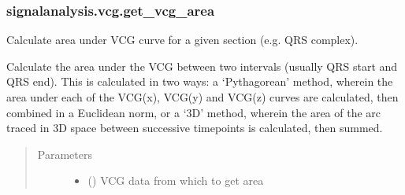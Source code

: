 \documentclass[letterpaper,10pt,english]{sphinxmanual}
\begin{document}
\subsubsection{signalanalysis.vcg.get\_vcg\_area}
\label{\detokenize{_autosummary/signalanalysis.vcg.get_vcg_area:signalanalysis-vcg-get-vcg-area}}\label{\detokenize{_autosummary/signalanalysis.vcg.get_vcg_area::doc}}

\begin{fulllineitems}
\label{\detokenize{_autosummary/signalanalysis.vcg.get_vcg_area:signalanalysis.vcg.get_vcg_area}}
\sphinxAtStartPar
Calculate area under VCG curve for a given section (e.g. QRS complex).

\sphinxAtStartPar
Calculate the area under the VCG between two intervals (usually QRS start and QRS end). This is calculated in two
ways: a ‘Pythagorean’ method, wherein the area under each of the VCG(x), VCG(y) and VCG(z) curves are calculated,
then combined in a Euclidean norm, or a ‘3D’ method, wherein the area of the arc traced in 3D space between
successive timepoints is calculated, then summed.
\begin{quote}\begin{description}
\item[{Parameters}] \leavevmode\begin{itemize}
\item {} 
\sphinxAtStartPar
{} () \textendash{} VCG data from which to get area


\end{itemize}
\end{description}
\end{quote}
\end{fulllineitems}
\end{document}
